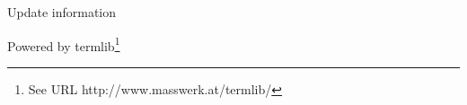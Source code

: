 
Update information\newline


Powered by termlib\footnote{See URL http://www.masswerk.at/termlib/}\label{f0}
